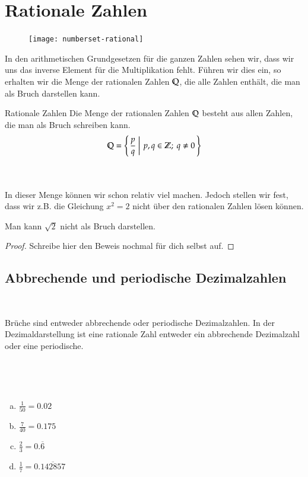 \section{Rationale Zahlen}
\begin{figure}
	\vspace{-2cm}
	\texttt{[image: numberset-rational]}
	\vspace{-2cm}
\end{figure}
In den arithmetischen Grundgesetzen für die ganzen Zahlen sehen wir, dass wir uns das inverse Element für die Multiplikation fehlt.
Führen wir dies ein, so erhalten wir die Menge der rationalen Zahlen $\mathbb{Q}$, die alle Zahlen enthält, die man als Bruch darstellen kann. 
\newpage
\begin{defn}{Rationale Zahlen}
	Die Menge der rationalen Zahlen $\mathbb{Q}$ besteht aus allen Zahlen, die man als Bruch schreiben kann.
	\begin{align*}
		\mathbb{Q} = \left\{\left. \frac{p}{q} ~\right|~ p,q \in \mathbb{Z};~ q \neq 0\, \right\}
	\end{align*}
\end{defn}

~\\~\\
In dieser Menge können wir schon relativ viel machen.
Jedoch stellen wir fest, dass wir z.B. die Gleichung $x^2 = 2$ nicht über den rationalen Zahlen lösen können.

\begin{claim}
 Man kann $\sqrt{2}$ nicht als Bruch darstellen.
\end{claim}

\begin{proof}
 Schreibe hier den Beweis nochmal für dich selbst auf.
 \vfill
\end{proof}

\newpage
\subsection{Abbrechende und periodische Dezimalzahlen}
\label{sec:periodic}

~\vspace{.5cm}
\begin{law}{Brüche sind entweder abbrechende oder periodische Dezimalzahlen.}
\label{law:rationalsArePeriodic}
	In der Dezimaldarstellung ist eine rationale Zahl entweder ein abbrechende Dezimalzahl oder eine periodische.
\end{law}
~
\begin{example}~
	\begin{enumerate}[a)]
		\setlength\itemsep{0pt}
		\item $\frac{1}{50} = 0.02$
		\item $\frac{7}{40} = 0.175$
		\item $\frac{2}{3} = 0.\overline{6}$
		\item $\frac{1}{7} = 0.\overline{142857}$
	\end{enumerate}
\end{example}


